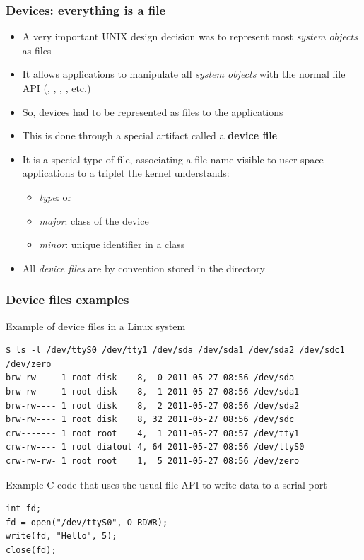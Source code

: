 \begin{frame}
  \frametitle{Devices: everything is a file}
  \begin{itemize}
  \item A very important UNIX design decision was to represent most
    {\em system objects} as files
  \item It allows applications to manipulate all {\em system objects} with
    the normal file API (, , ,
    , etc.)
  \item So, devices had to be represented as files to the applications
  \item This is done through a special artifact called a {\bf device
      file}
  \item It is a special type of file, associating a file name
    visible to user space applications to a triplet the kernel understands:
    \begin{itemize}
    \item {\em type}:  or 
    \item {\em major}: class of the device
    \item {\em minor}: unique identifier in a class
    \end{itemize}
  \item All {\em device files} are by convention stored in the
     directory
  \end{itemize}
\end{frame}

\begin{frame}[fragile]
\frametitle{Device files examples}

Example of device files in a Linux system

\small
\begin{verbatim}
$ ls -l /dev/ttyS0 /dev/tty1 /dev/sda /dev/sda1 /dev/sda2 /dev/sdc1 /dev/zero
brw-rw---- 1 root disk    8,  0 2011-05-27 08:56 /dev/sda
brw-rw---- 1 root disk    8,  1 2011-05-27 08:56 /dev/sda1
brw-rw---- 1 root disk    8,  2 2011-05-27 08:56 /dev/sda2
brw-rw---- 1 root disk    8, 32 2011-05-27 08:56 /dev/sdc
crw------- 1 root root    4,  1 2011-05-27 08:57 /dev/tty1
crw-rw---- 1 root dialout 4, 64 2011-05-27 08:56 /dev/ttyS0
crw-rw-rw- 1 root root    1,  5 2011-05-27 08:56 /dev/zero
\end{verbatim}
\normalsize

Example C code that uses the usual file API to write data to a serial port

\small
\begin{verbatim}
int fd;
fd = open("/dev/ttyS0", O_RDWR);
write(fd, "Hello", 5);
close(fd);
\end{verbatim}
\end{frame}

